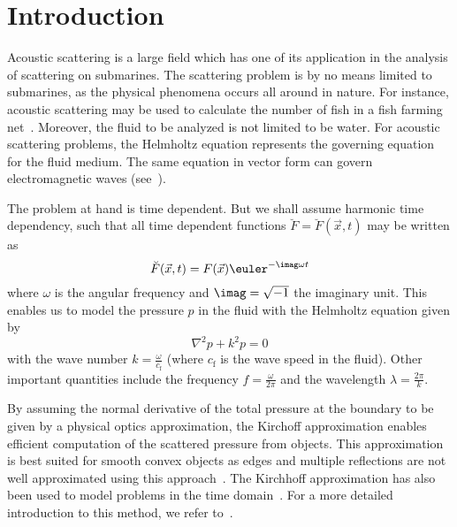 \section{Introduction}
Acoustic scattering is a large field which has one of its application in the analysis of scattering on submarines. The scattering problem is by no means limited to submarines, as the physical phenomena occurs all around in nature. For instance, acoustic scattering may be used to calculate the number of fish in a fish farming net~\cite{conti2006amo}. Moreover, the fluid to be analyzed is not limited to be water. For acoustic scattering problems, the Helmholtz equation represents the governing equation for the fluid medium. The same equation in vector form can govern electromagnetic waves (see~\cite{Manh2012iaa}).

The problem at hand is time dependent. But we shall assume harmonic time dependency, such that all time dependent functions $\breve{F}=\breve{F}(\vec{x},t)$ may be written as
\begin{equation}\label{Eq4:periodicityAssumption}
	\breve{F}(\vec{x}, t) = F(\vec{x})\euler^{-\imag\omega t}
\end{equation}
where $\omega$ is the angular frequency and $\imag = \sqrt{-1}$ the imaginary unit. This enables us to model the pressure $p$ in the fluid with the Helmholtz equation given by
\begin{equation}\label{Eq4:HelmholtzEquationIntro}
	\nabla^2 p + k^2 p = 0
\end{equation}
with the wave number $k=\frac{\omega}{c_{\mathrm{f}}}$ (where $c_{\mathrm{f}}$ is the wave speed in the fluid). Other important quantities include the frequency $f=\frac{\omega}{2\pi}$ and the wavelength $\lambda = \frac{2\pi}{k}$.

By assuming the normal derivative of the total pressure at the boundary to be given by a physical optics approximation, the Kirchoff approximation enables efficient computation of the scattered pressure from objects. This approximation is best suited for smooth convex objects as edges and multiple reflections are not well approximated using this approach~\cite{Fawcett2001moh}. The Kirchhoff approximation has also been used to model problems in the time domain~\cite{Fawcett2001moh, Pouliquen1999tem}. For a more detailed introduction to this method, we refer to~\cite{Medwin1997foa}.


